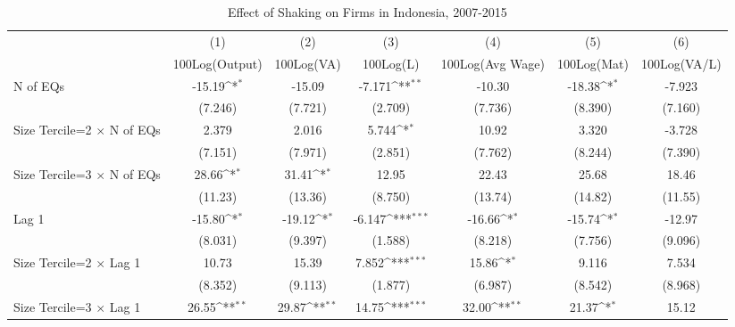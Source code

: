 \begin{table}[htbp]\centering
\def\sym#1{\ifmmode^{#1}\else\(^{#1}\)\fi}
\caption{Effect of Shaking on Firms in Indonesia, 2007-2015}
\begin{tabular}{l*{6}{c}}
\toprule
                &\multicolumn{1}{c}{(1)}&\multicolumn{1}{c}{(2)}&\multicolumn{1}{c}{(3)}&\multicolumn{1}{c}{(4)}&\multicolumn{1}{c}{(5)}&\multicolumn{1}{c}{(6)}\\
                &\multicolumn{1}{c}{100Log(Output)}&\multicolumn{1}{c}{100Log(VA)}&\multicolumn{1}{c}{100Log(L)}&\multicolumn{1}{c}{100Log(Avg Wage)}&\multicolumn{1}{c}{100Log(Mat)}&\multicolumn{1}{c}{100Log(VA/L)}\\
\midrule
N of EQs        &   -15.19\sym{*}  &   -15.09         &   -7.171\sym{**} &   -10.30         &   -18.38\sym{*}  &   -7.923         \\
                &  (7.246)         &  (7.721)         &  (2.709)         &  (7.736)         &  (8.390)         &  (7.160)         \\
\addlinespace
Size Tercile=2 $\times$ N of EQs&    2.379         &    2.016         &    5.744\sym{*}  &    10.92         &    3.320         &   -3.728         \\
                &  (7.151)         &  (7.971)         &  (2.851)         &  (7.762)         &  (8.244)         &  (7.390)         \\
\addlinespace
Size Tercile=3 $\times$ N of EQs&    28.66\sym{*}  &    31.41\sym{*}  &    12.95         &    22.43         &    25.68         &    18.46         \\
                &  (11.23)         &  (13.36)         &  (8.750)         &  (13.74)         &  (14.82)         &  (11.55)         \\
\addlinespace
Lag 1           &   -15.80\sym{*}  &   -19.12\sym{*}  &   -6.147\sym{***}&   -16.66\sym{*}  &   -15.74\sym{*}  &   -12.97         \\
                &  (8.031)         &  (9.397)         &  (1.588)         &  (8.218)         &  (7.756)         &  (9.096)         \\
\addlinespace
Size Tercile=2 $\times$ Lag 1&    10.73         &    15.39         &    7.852\sym{***}&    15.86\sym{*}  &    9.116         &    7.534         \\
                &  (8.352)         &  (9.113)         &  (1.877)         &  (6.987)         &  (8.542)         &  (8.968)         \\
\addlinespace
Size Tercile=3 $\times$ Lag 1&    26.55\sym{**} &    29.87\sym{**} &    14.75\sym{***}&    32.00\sym{**} &    21.37\sym{*}  &    15.12         \\

\end{tabular}
\end{table}
